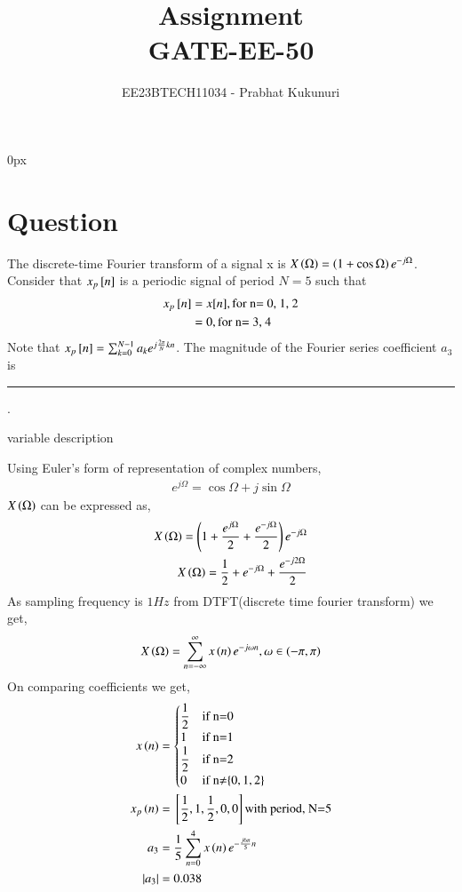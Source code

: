 \documentclass[journal,12pt,twocolumn]{IEEEtran}
\theoremstyle{remark}
\begin{document}
\parindent 0px


\vspace{3cm}

\title{Assignment\\[1ex]GATE-EE-50}
\author{EE23BTECH11034 - Prabhat Kukunuri$^{}$%
}
\maketitle
\newpage
\bigskip

\renewcommand{\thefigure}{\theenumi}
\renewcommand{\thetable}{\theenumi}
\section{Question}
The discrete-time Fourier transform of a signal x is $X\left(\Omega\right)=\left(1+\cos{\Omega}\right)e^{-j\Omega}$. Consider that $x_{p}{}\left[n\right]$ is a periodic signal of period $N=5$ such that
\begin{align}
    x_p{}\left[n\right]&=x[n],\text{for n= 0, 1, 2}\\
    &=0,\text{for n= 3, 4}
\end{align}
Note that $x_p{}\left[n\right]=\sum_{k=0}^{N-1}a_{k}e^{j\frac{2\pi}{N}kn}$. The magnitude of the Fourier series coefficient $a_3$ is \rule{3cm}{0.15mm} .\\
\solution
\begin{table}[h]
    \centering
    
    \caption{variable description}
    \label{tab:my_label}
\end{table}
Using Euler's form of representation of complex numbers,
\begin{align}
    e^{j\Omega}=\cos{\Omega}+j\sin{\Omega}
\end{align}
$X\left(\Omega\right)$ can be expressed as,
\begin{align}
    X\left(\Omega\right)=\left(1+\frac{e^{j\Omega}}{2}+\frac{e^{-j\Omega}}{2}\right)e^{-j\Omega}\\
    X\left(\Omega\right)=\frac{1}{2}+e^{-j\Omega}+\frac{e^{-j2\Omega}}{2}
\end{align}
As sampling frequency is $1Hz$ \brak{\omega=\Omega} from DTFT(discrete time fourier transform) we get,
\begin{align}
    X\left(\Omega\right)=\sum^{\infty}_{n=-\infty}x\left(n\right)e^{-j\omega n},   \omega \in \left(-\pi,\pi\right)
\end{align}
On comparing coefficients we get,
\begin{align}
    x\left(n\right)&=
    \begin{cases}
        \dfrac{1}{2} & \text{if n=0}\\
        1 & \text{if n=1}\\
        \dfrac{1}{2} & \text{if n=2}\\
        0 & \text{if n$\neq$\ensuremath{\left\{0,1,2\right\}} }
    \end{cases}\\
    x_{p}\left(n\right)&={}\left[\frac{1}{2},1,\frac{1}{2},0,0\right] \text{with period, N=5}\\
    a_3&=\frac{1}{5}\sum^{4}_{n=0}x\left(n\right)e^{-\frac{j6\pi}{5}n}\\
    |a_3|&=0.038
\end{align}
\end{document}
